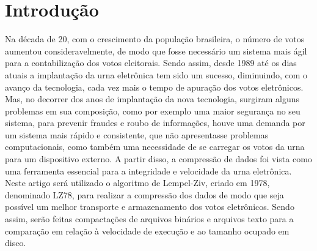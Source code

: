 \documentclass[
	article,			
	11pt,				
	oneside,			
	a4paper,			
	english,			
	brazil,				
	sumario=tradicional
	]{abntex2}
\begin{document}

\frenchspacing 


\textual

\section*{Introdução}
Na década de 20, com o crescimento da população brasileira, o número de votos aumentou consideravelmente, de modo que fosse necessário um sistema mais ágil para a contabilização dos votos eleitorais. Sendo assim, desde 1989 até os dias atuais a implantação da urna eletrônica tem sido um sucesso, diminuindo, com o avanço da tecnologia, cada vez mais o tempo de apuração dos votos eletrônicos. Mas, no decorrer dos anos de implantação da nova tecnologia, surgiram alguns problemas em sua composição, como por exemplo uma maior segurança no seu sistema, para prevenir fraudes e roubo de informações, houve uma demanda por um sistema mais rápido e consistente, que não apresentasse problemas computacionais, como também uma necessidade de se carregar os votos da urna para um dispositivo externo. A partir disso, a compressão de dados foi vista como uma ferramenta essencial para a integridade e velocidade da urna eletrônica. Neste artigo será utilizado o algoritmo de Lempel-Ziv, criado em 1978, denominado LZ78, para realizar a compressão dos dados de modo que seja possível um melhor transporte e armazenamento dos votos eletrônicos. Sendo assim, serão feitas compactações de arquivos binários e arquivos texto para a comparação em relação à velocidade de execução e ao tamanho ocupado em disco.
\end{document}
